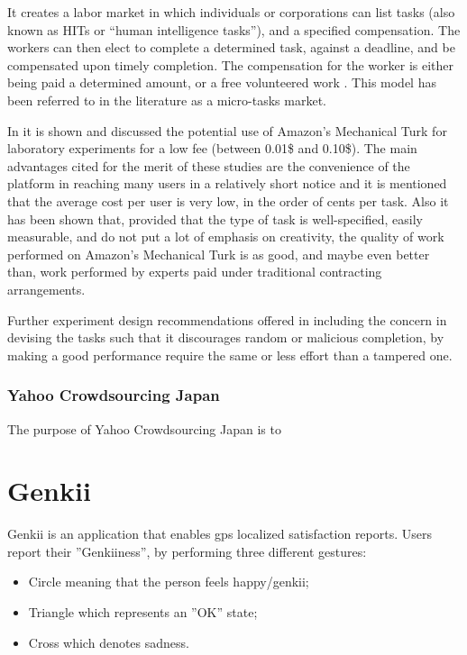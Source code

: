 \documentclass[letterpaper]{article}
\begin{document}
It creates a labor market in which individuals or corporations can list tasks (also known as HITs or “human intelligence tasks”), and a specified compensation. The workers can then elect to complete a determined task, against a deadline, and be compensated upon timely completion. The compensation for the worker is either being paid a determined amount, or a free volunteered work \cite{Mason2010}. 
This model has been referred to in the literature as a micro-tasks market\cite{Kittur2008}.

In \cite{Mason2010} it is shown and discussed the potential use of Amazon’s Mechanical Turk for laboratory experiments for a low fee (between 0.01\$ and 0.10\$).
The main advantages cited for the merit of these studies are the convenience of the platform in reaching many users in a relatively short notice and it is mentioned that the average cost per user is very low, in the order of cents per task.
Also it has been shown \cite{Kittur2008} that, provided that the type of task is well-specified, easily measurable, and do not put a lot of emphasis on creativity,  the quality of work performed on Amazon’s Mechanical Turk is as good, and maybe even better than, work performed by experts paid under traditional contracting arrangements.

Further experiment design recommendations offered in \cite{Kittur2008} including the concern in devising the tasks such that it discourages random or malicious completion, by making a good performance require the same or less effort than a tampered one.


\subsubsection{Yahoo Crowdsourcing Japan}

The purpose of Yahoo Crowdsourcing Japan is to 


\section{Genkii}


Genkii is an application that enables gps localized satisfaction reports. Users report their ''Genkiiness'', by performing three different gestures:

\begin{itemize}
	\item Circle meaning that the person feels happy/genkii;
	\item Triangle which represents an ''OK'' state;
	\item Cross which denotes sadness.
\end{itemize}
\end{document}
